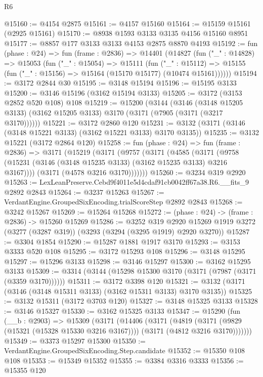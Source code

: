 \begin{lexlean}{R6}
\begin{coremodule}
@15160 := @4154 @2875
@15161 := @4157 @15160
@15164 := @15159 @15161 (@2925 @15161)
@15170 := @8938 @1593 @3133 @3135 @4156 @15160 @8951
@15177 := @8857 @177 @3133 @3133 @4153 @2875 @8870 @4193
@15192 := fun (phase : @24) =>
  fun (frame : @2836) =>
  @14401
    (@14827
      (fun ("_" : @14828) =>
      @15053
        (fun ("_" : @15054) =>
        @15111
          (fun ("_" : @15112) =>
          @15155 (fun ("_" : @15156) => @15164 (@15170 @15177) (@10474 @15161))))))
@15194 := @3172 @2844 @30
@15195 := @3148 @15194
@15196 := @15195 @3133
@15200 := @3146 @15196 (@3162 @15194 @3133)
@15205 := @3172 (@3153 @2852 @520 @108) @108
@15219 := @15200
    (@3144
      (@3146 (@3148 @15205 @3133) (@3162 @15205 @3133) @3170 (@3171 (@7905 (@3171 (@3217 @3170))))))
@15221 := @3172 @2860 @120
@15231 := @3132 (@3171 (@3146 (@3148 @15221 @3133) (@3162 @15221 @3133) @3170 @3135))
@15235 := @3132 @15221 (@3172 @2864 @120)
@15258 := fun (phase : @24) =>
  fun (frame : @2836) =>
  @3171
    (@15219
      (@3171
        (@9757
          (@3171
            (@4585
              (@3171 (@9758 (@15231 (@3146 (@3148 @15235 @3133) (@3162 @15235 @3133) @3216 @3167))))
              (@3171 (@4578 @3216 @3170)))))))
@15260 := @3234 @319 @2920
@15263 := LexLeanPreserve.Cebd9f4011e5d4cdaf91cb0042ff67a38.R6.__fits_9 @2892 @2843
@15264 := @3237 @15263
@15267 := VerdantEngine.GroupedSixEncoding.trialScoreStep @2892 @2843
@15268 := @3242 @15267
@15269 := @15264 @15268
@15272 := (phase : @24) -> (frame : @2836) -> @15260 @15269
@15286 := @3252
    @319
    @2920
    @15269
    @1919
    @3272
    (@3277 (@3287 @319))
    (@3293 (@3294 (@3295 @1919) @2920 @3270))
@15287 := @3304 @1854
@15290 := @15287 @1881 @1917 @3170
@15293 := @3153 @3333 @520 @108
@15295 := @3172 @15293 @108
@15296 := @3148 @15295
@15297 := @15296 @3133
@15298 := @3146 @15297
@15300 := @3162 @15295 @3133
@15309 := @3314 (@3144 (@15298 @15300 @3170 (@3171 (@7987 (@3171 (@3359 @3170))))))
@15311 := @3172 @3398 @120
@15321 := @3132 (@3171 (@3146 (@3148 @15311 @3133) (@3162 @15311 @3133) @3170 @3135))
@15325 := @3132 @15311 (@3172 @3703 @120)
@15327 := @3148 @15325 @3133
@15328 := @3146 @15327
@15330 := @3162 @15325 @3133
@15347 := @15290
    (fun (__b : @2903) =>
    @15309
      (@3171
        (@14406
          (@3171
            (@4819
              (@3171 (@9829 (@15321 (@15328 @15330 @3216 @3167))))
              (@3171 (@4812 @3216 @3170)))))))
@15349 := @3373 @15297 @15300
@15350 := VerdantEngine.GroupedSixEncoding.Step.candidate
@15352 := @15350 @108 @108
@15353 := @15349 @15352
@15355 := @3384 @3316 @3333
@15356 := @15355 @120

\end{coremodule}
\end{lexlean}
